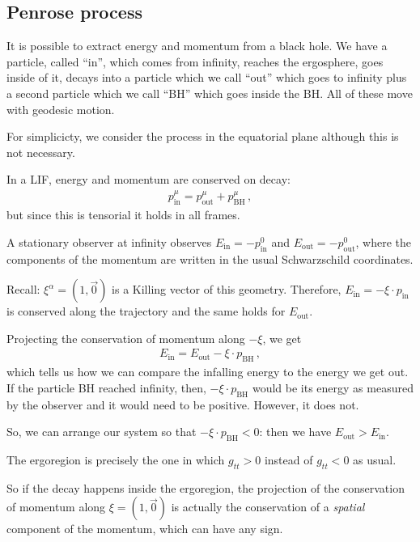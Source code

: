 \documentclass[main.tex]{subfiles}
\begin{document}
\subsection{Penrose process}

It is possible to extract energy and momentum from a black hole. 
We have a particle, called ``in'', which comes from infinity, reaches the ergosphere, goes inside of it, decays into a particle which we call ``out'' which goes to infinity plus a second particle which we call ``BH'' which goes inside the BH. 
All of these move with geodesic motion. 

For simplicicty, we consider the process in the equatorial plane although this is not necessary. 

In a LIF, energy and momentum are conserved on decay: 
%
\begin{align}
  p^{\mu }_{\text{in}} = p^{\mu }_{\text{out}} + p^{\mu } _{\text{BH}}
\,,
\end{align}
%
but since this is tensorial it holds in all frames. 

A stationary observer at infinity observes \(E _{\text{in}} = -p _{\text{in}}^{0}\) and \(E _{\text{out}} = - p^{0} _{\text{out}}\), where the components of the momentum are written in the usual Schwarzschild coordinates. 

Recall: \(\xi^{\alpha }= (1, \vec{0})\) is a Killing vector of this geometry. Therefore, \(E _{\text{in}} = - \xi \cdot p _{\text{in}}\) is conserved along the trajectory and the same holds for \(E _{\text{out}}\). 

Projecting the conservation of momentum along \(- \xi \), we get 
%
\begin{align}
  E _{\text{in}} = E _{\text{out}} - \xi \cdot p_{\text{BH}}
\,,
\end{align}
%
which tells us how we can compare the infalling energy to the energy we get out. 
If the particle BH reached infinity, then, \(- \xi \cdot p _{\text{BH}}\) would be its energy as measured by the observer and it would need to be positive. 
However, it does not. 

So, we can arrange our system so that \(-\xi \cdot p _{\text{BH}} < 0 \): then we have \(E _{\text{out}} > E _{\text{in}}\). 

The ergoregion is precisely the one in which \(g_{tt} >0 \) instead of \(g_{tt}<0\) as usual. 

So if the decay happens inside the ergoregion, the projection of the conservation of momentum along \(\xi = (1, \vec{0})\) is actually the conservation of a \emph{spatial} component of the momentum, which can have any sign. 
\end{document}
